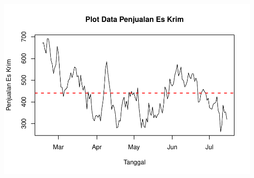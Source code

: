 \documentclass[
]{book}
\begin{document}
\begin{center}\includegraphics{_main_files/figure-latex/Contoh Soal-1} \end{center}
\end{document}
